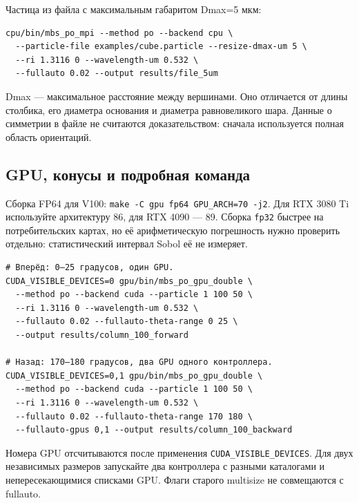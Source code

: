 Частица из файла с максимальным габаритом Dmax=5 мкм:

\noindent\begin{minipage}{\linewidth}
\begin{verbatim}
cpu/bin/mbs_po_mpi --method po --backend cpu \
  --particle-file examples/cube.particle --resize-dmax-um 5 \
  --ri 1.3116 0 --wavelength-um 0.532 \
  --fullauto 0.02 --output results/file_5um
\end{verbatim}
\end{minipage}

Dmax --- максимальное расстояние между вершинами. Оно отличается от
длины столбика, его диаметра основания и диаметра равновеликого шара.
Данные о симметрии в файле не считаются доказательством: сначала
используется полная область ориентаций.

\subsection{GPU, конусы и подробная
команда}\label{gpu-ux43aux43eux43dux443ux441ux44b-ux438-ux43fux43eux434ux440ux43eux431ux43dux430ux44f-ux43aux43eux43cux430ux43dux434ux430}

Сборка FP64 для V100: \texttt{make\ -C\ gpu\ fp64\ GPU\_ARCH=70\ -j2}.
Для RTX 3080 Ti используйте архитектуру 86, для RTX 4090 --- 89. Сборка
\texttt{fp32} быстрее на потребительских картах, но её арифметическую
погрешность нужно проверить отдельно: статистический интервал Sobol её
не измеряет.

\noindent\begin{minipage}{\linewidth}
\begin{verbatim}
# Вперёд: 0–25 градусов, один GPU.
CUDA_VISIBLE_DEVICES=0 gpu/bin/mbs_po_gpu_double \
  --method po --backend cuda --particle 1 100 50 \
  --ri 1.3116 0 --wavelength-um 0.532 \
  --fullauto 0.02 --fullauto-theta-range 0 25 \
  --output results/column_100_forward

# Назад: 170–180 градусов, два GPU одного контроллера.
CUDA_VISIBLE_DEVICES=0,1 gpu/bin/mbs_po_gpu_double \
  --method po --backend cuda --particle 1 100 50 \
  --ri 1.3116 0 --wavelength-um 0.532 \
  --fullauto 0.02 --fullauto-theta-range 170 180 \
  --fullauto-gpus 0,1 --output results/column_100_backward
\end{verbatim}
\end{minipage}

Номера GPU отсчитываются после применения
\nolinkurl{CUDA_VISIBLE_DEVICES}. Для двух независимых размеров
запускайте два контроллера с разными каталогами и непересекающимися
списками GPU. Флаги старого multisize не совмещаются с fullauto.

